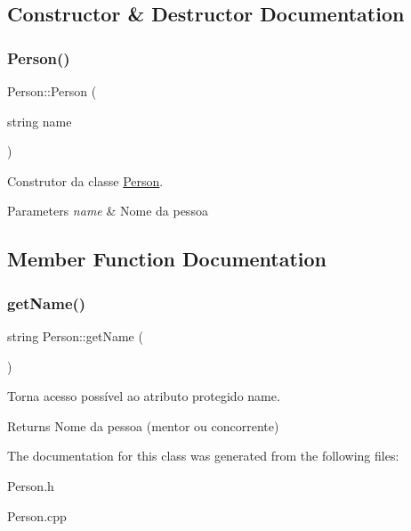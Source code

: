 \subsection{Constructor \& Destructor Documentation}
\hypertarget{class_person_aba0adcb7be258cfdda603c6261a61985}{}\label{class_person_aba0adcb7be258cfdda603c6261a61985} 
\subsubsection{\texorpdfstring{Person()}{Person()}}
{\footnotesize\ttfamily Person\+::\+Person (\begin{DoxyParamCaption}\item[{string}]{name }\end{DoxyParamCaption})}



Construtor da classe \hyperlink{class_person}{Person}. 


\begin{DoxyParams}{Parameters}
{\em name} & Nome da pessoa \\
\hline
\end{DoxyParams}


\subsection{Member Function Documentation}
\hypertarget{class_person_a1f98501a519ee5d44f53a6d6423ae67b}{}\label{class_person_a1f98501a519ee5d44f53a6d6423ae67b} 
\subsubsection{\texorpdfstring{get\+Name()}{getName()}}
{\footnotesize\ttfamily string Person\+::get\+Name (\begin{DoxyParamCaption}{ }\end{DoxyParamCaption})}



Torna acesso possível ao atributo protegido name. 

\begin{DoxyReturn}{Returns}
Nome da pessoa (mentor ou concorrente) 
\end{DoxyReturn}


The documentation for this class was generated from the following files\+:\begin{DoxyCompactItemize}
\item 
Person.\+h\item 
Person.\+cpp\end{DoxyCompactItemize}
